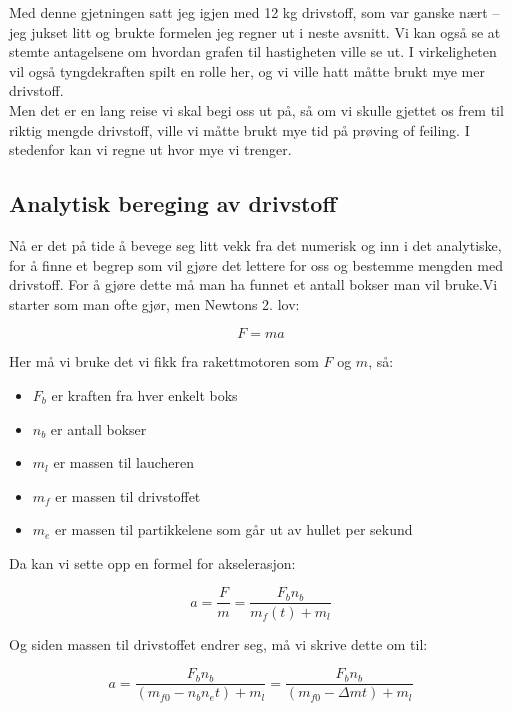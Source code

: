 \documentclass[a4paper,norsk,11pt,twoside]{article}
\begin{document}
Med denne gjetningen satt jeg igjen med 12 kg drivstoff, som var ganske nært --jeg jukset litt og brukte formelen jeg regner ut i neste avsnitt. Vi kan også se at stemte antagelsene om hvordan grafen til hastigheten ville se ut. I virkeligheten vil også tyngdekraften spilt en rolle her, og vi ville hatt måtte brukt mye mer drivstoff. \\

Men det er en lang reise vi skal begi oss ut på, så om vi skulle gjettet os frem til riktig mengde drivstoff, ville vi måtte brukt mye tid på prøving of feiling. I stedenfor kan vi regne ut hvor mye vi trenger.


\subsection{Analytisk bereging av drivstoff}

Nå er det på tide å bevege seg litt vekk fra det numerisk og inn i det analytiske, for å finne et begrep som vil gjøre det lettere for oss og bestemme mengden med drivstoff. For å gjøre dette må man ha funnet et antall bokser man vil bruke.Vi starter som man ofte gjør, men Newtons 2. lov:

\begin{equation}
F = ma
\end{equation}

Her må vi bruke det vi fikk fra rakettmotoren som $F$ og $m$, så:

\begin{itemize}
\item $F_b$ er kraften fra hver enkelt boks
\item $n_b$ er antall bokser
\item $m_l$ er massen til laucheren
\item $m_f$ er massen til drivstoffet
\item $m_e$ er massen til partikkelene som går ut av hullet per sekund
\end{itemize}

Da kan vi sette opp en formel for akselerasjon:

\begin{equation}
a = \frac{F}{m} = \frac{F_b n_b}{m_f(t) + m_l} 
\end{equation} 

Og siden massen til drivstoffet endrer seg, må vi skrive dette om til:

\begin{equation}
a = \frac{F_b n_b}{(m_{f0} - n_b n_e t) + m_l} = \frac{F_b n_b}{(m_{f0} - \Delta m t) + m_l}
\end{equation} 
\end{document}
